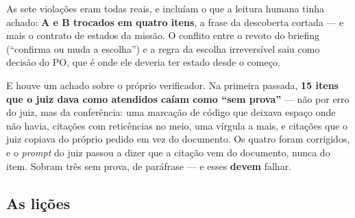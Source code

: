 \documentclass[11pt,a4paper]{article}
\begin{document}
\begin{center}
\end{center}

As sete violações eram todas reais, e incluíam o que a leitura humana tinha achado: \textbf{A e B trocados em quatro itens}, a frase da descoberta cortada --- e mais o contrato de estados da missão. O conflito entre o revoto do briefing (``confirma ou muda a escolha'') e a regra da escolha irreversível saiu como decisão do PO, que é onde ele deveria ter estado desde o começo.

E houve um achado sobre o próprio verificador. Na primeira passada, \textbf{15 itens que o juiz dava como atendidos caíam como ``sem prova''} --- não por erro do juiz, mas da conferência: uma marcação de código que deixava espaço onde não havia, citações com reticências no meio, uma vírgula a mais, e citações que o juiz copiava do próprio pedido em vez do documento. Os quatro foram corrigidos, e o \emph{prompt} do juiz passou a dizer que a citação vem do documento, nunca do item. Sobram três sem prova, de paráfrase --- e esses \textbf{devem} falhar.

\subsection{As lições}
\end{document}
